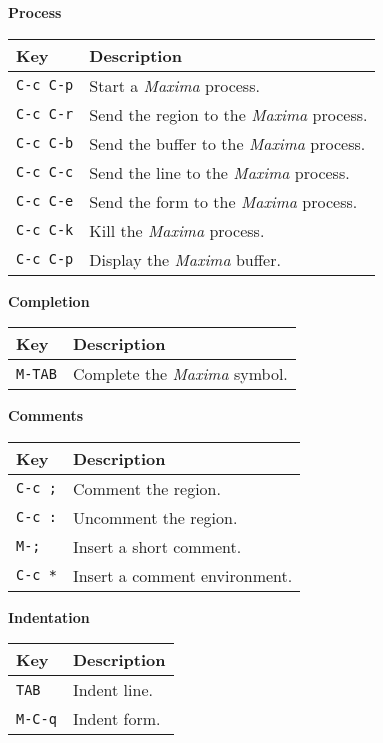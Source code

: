 \documentclass{article}
\newcommand{\mx}{\textsl{\sffamily Maxima}}
\begin{document}
\noindent
\textbf{Process}

\smallskip

\noindent
\begin{tabular}{p{\firstcol}p{\secondcol}}
\hline
\textbf{Key} & \textbf{Description}\\
\hline
\texttt{C-c C-p} & Start a \mx{} process.\\
\texttt{C-c C-r} & Send the region to the \mx{} process.\\
\texttt{C-c C-b} & Send the buffer to the \mx{} process.\\
\texttt{C-c C-c} & Send the line to the \mx{} process.\\
\texttt{C-c C-e} & Send the form to the \mx{} process.\\
\texttt{C-c C-k} & Kill the \mx{} process.\\
\texttt{C-c C-p} & Display the \mx{} buffer.
\end{tabular}

\smallskip

\noindent
\textbf{Completion}

\smallskip

\noindent
\begin{tabular}{p{\firstcol}p{\secondcol}}
\hline
\textbf{Key} & \textbf{Description}\\
\hline
\texttt{M-TAB} & Complete the \mx{} symbol.\\
\end{tabular}

\smallskip

\noindent
\textbf{Comments}

\smallskip

\noindent
\begin{tabular}{p{\firstcol}p{\secondcol}}
\hline
\textbf{Key} & \textbf{Description}\\
\hline
\texttt{C-c ;} & Comment the region.\\
\texttt{C-c :} & Uncomment the region.\\
\texttt{M-;} & Insert a short comment.\\
\texttt{C-c *} & Insert a comment environment.
\end{tabular}


\smallskip

\noindent
\textbf{Indentation}

\smallskip

\noindent
\begin{tabular}{p{\firstcol}p{\secondcol}}
\hline
\textbf{Key} & \textbf{Description}\\
\hline
\texttt{TAB} & Indent line.\\
\texttt{M-C-q} & Indent form.
\end{tabular}
\end{document}
